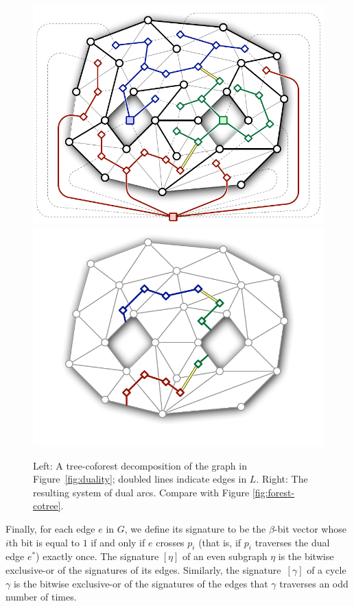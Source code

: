 \documentclass[11pt,twoside]{article}
\let\cycle\gamma
\def\dualarc{p}
\begin{document}
\begin{figure}[htb]
\centering\footnotesize\sf
\includegraphics[scale=0.45]{Fig/tree-coforest2} \qquad
\includegraphics[scale=0.45]{Fig/tree-coforest-arcs2}
\caption{Left: A tree-coforest decomposition of the graph in Figure~\ref{fig:duality}; doubled lines indicate edges in $L$.
Right: The resulting system of dual arcs.  Compare with Figure \ref{fig:forest-cotree}.}
\label{fig:tree-coforest}
\end{figure}

Finally, for each edge $e$ in $G$, we define its signature \EMPH{$[e]$} to be the $\beta$-bit vector whose $i$th bit is equal to $1$ if and only if $e$ crosses $\dualarc_i$ (that is, if $\dualarc_i$ traverses the dual edge $e^*$) exactly once.  The signature $[\eta]$ of an even subgraph $\eta$ is the bitwise exclusive-or of the signatures of its edges.  Similarly, the signature~$[\cycle]$ of a cycle $\cycle$ is the bitwise exclusive-or of the signatures of the edges that $\cycle$ traverses an odd number of times.
\end{document}
